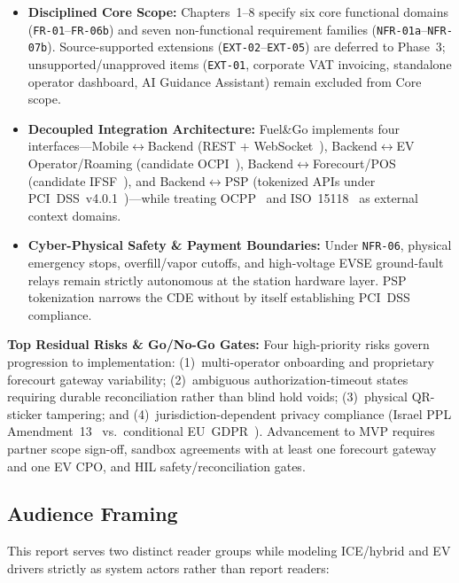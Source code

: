 \begin{insightcard}
  \begin{itemize}[leftmargin=12pt, itemsep=1pt, topsep=1pt]
    \item \textbf{Disciplined Core Scope:} Chapters~1--8 specify six core functional domains (\texttt{FR-01}--\texttt{FR-06b}) and seven non-functional requirement families (\texttt{NFR-01a}--\texttt{NFR-07b}). Source-supported extensions (\texttt{EXT-02}--\texttt{EXT-05}) are deferred to Phase~3; unsupported/unapproved items (\texttt{EXT-01}, corporate VAT invoicing, standalone operator dashboard, AI Guidance Assistant) remain excluded from Core scope.
    \item \textbf{Decoupled Integration Architecture:} Fuel\&Go implements four interfaces---Mobile$\leftrightarrow$Backend (REST + WebSocket~\cite{rfc9110,rfc6455}), Backend$\leftrightarrow$EV Operator/Roaming (candidate OCPI~\cite{evroaming2025ocpi}), Backend$\leftrightarrow$Forecourt/POS (candidate IFSF~\cite{ifsf_specs}), and Backend$\leftrightarrow$PSP (tokenized APIs under PCI~DSS~v4.0.1~\cite{pcissc2024pcidss401})---while treating OCPP~\cite{oca2020ocpp201,oca2025ocpp21} and ISO~15118~\cite{iso15118_2_2014,iso15118_20_2022} as external context domains.
    \item \textbf{Cyber-Physical Safety \& Payment Boundaries:} Under \texttt{NFR-06}, physical emergency stops, overfill/vapor cutoffs, and high-voltage EVSE ground-fault relays remain strictly autonomous at the station hardware layer. PSP tokenization narrows the CDE without by itself establishing PCI~DSS compliance.
  \end{itemize}
\end{insightcard}

\textbf{Top Residual Risks \& Go/No-Go Gates:} Four high-priority risks govern progression to implementation: (1)~multi-operator onboarding and proprietary forecourt gateway variability; (2)~ambiguous authorization-timeout states requiring durable reconciliation rather than blind hold voids; (3)~physical QR-sticker tampering; and (4)~jurisdiction-dependent privacy compliance (Israel PPL Amendment~13~\cite{israel1981ppl} vs.\ conditional EU~GDPR~\cite{eu2016gdpr}). Advancement to MVP requires partner scope sign-off, sandbox agreements with at least one forecourt gateway and one EV CPO, and HIL safety/reconciliation gates.

\vspace{2pt}
\subsection*{Audience Framing}
\vspace{-2pt}
This report serves two distinct reader groups while modeling ICE/hybrid and EV drivers strictly as system actors rather than report readers:

